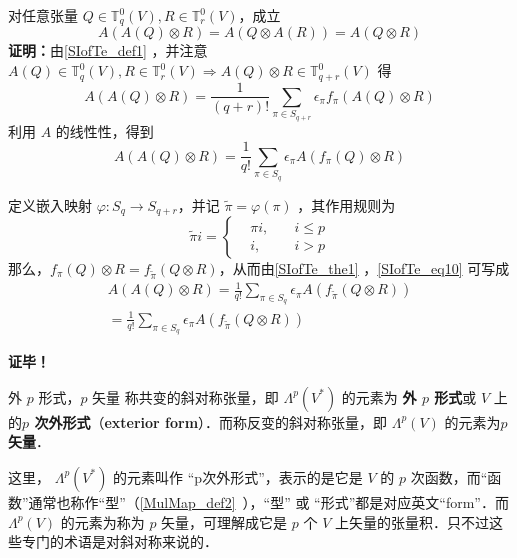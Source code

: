 \begin{theorem}{}
对任意张量 $Q\in\mathbb T_q^0(V),R\in\mathbb T_r^0(V)$，成立
\begin{equation}
A(A(Q)\otimes R)=A(Q\otimes A(R))=A(Q\otimes R)
\end{equation}
\textbf{证明：}由\autoref{SIofTe_def1} ，并注意 $A(Q)\in\mathbb T_q^0(V),R\in\mathbb T_r^0(V)\Rightarrow A(Q)\otimes R\in\mathbb T_{q+r}^0(V)$ 得
\begin{equation}
A(A(Q)\otimes R)=\frac{1}{(q+r)!}\sum_{\pi\in S_{q+r}}\epsilon_\pi f_{\pi}(A(Q)\otimes R)
\end{equation}
 利用 $A$ 的线性性，得到
 \begin{equation}\label{SIofTe_eq10}
 A(A(Q)\otimes R)=\frac{1}{q!}\sum_{\pi\in S_q}\epsilon_\pi A(f_{\pi}(Q)\otimes R)
 \end{equation}
 
 定义嵌入映射 $\varphi:S_q\rightarrow S_{q+r}$，并记 $\tilde \pi=\varphi(\pi)$ ，其作用规则为
 \begin{equation}
 \tilde\pi i=\left\{\begin{aligned}
 &\pi i,\quad &i\leq p\\
 &i,\quad &i>p
 \end{aligned}\right.
 \end{equation}
 那么，$f_\pi(Q)\otimes R=f_{\tilde\pi}(Q\otimes R)$，从而由\autoref{SIofTe_the1} ，\autoref{SIofTe_eq10} 可写成
 \begin{equation}
 \begin{aligned}
 A(A(Q)\otimes R)=\frac{1}{q!}\sum_{\pi\in S_q}\epsilon_\pi A(f_{\tilde\pi}(Q\otimes R))\\
=\frac{1}{q!}\sum_{\pi\in S_q}\epsilon_\pi A(f_{\tilde\pi}(Q\otimes R))
 \end{aligned}
 \end{equation}
 

\textbf{证毕！}

\end{theorem}
\begin{definition}{外 $p$ 形式，$p$ 矢量}\label{SIofTe_def2}
称共变的斜对称张量，即 $\Lambda^p(V^*)$ 的元素为 \textbf{外 $p$ 形式}或 $V$ 上的\textbf{$p$ 次外形式}（\textbf{exterior form}）．而称反变的斜对称张量，即 $\Lambda^p(V)$ 的元素为\textbf{$p$矢量}．
\end{definition}

这里， $\Lambda^p(V^*)$ 的元素叫作 “p次外形式”，表示的是它是 $V$ 的 $p$ 次函数，而“函数”通常也称作“型”（\autoref{MulMap_def2}~），“型” 或 “形式”都是对应英文“form”．而 $\Lambda^p(V)$ 的元素为称为 $p$ 矢量，可理解成它是 $p$ 个 $V$ 上矢量的张量积．只不过这些专门的术语是对斜对称来说的．

